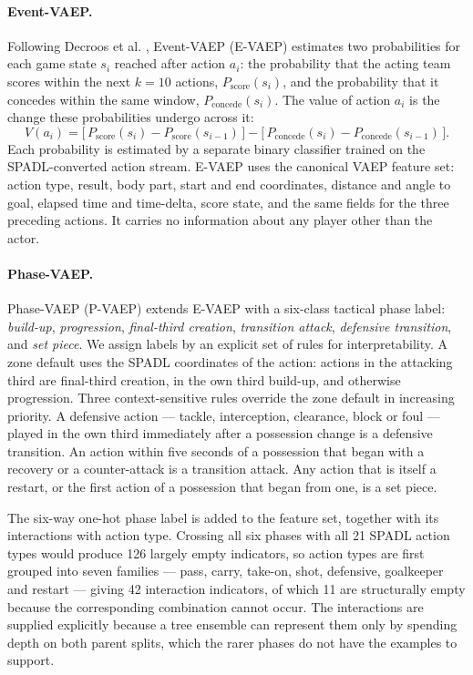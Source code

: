 \documentclass[runningheads]{llncs}
\begin{document}
\paragraph{\textbf{Event-VAEP.}}
Following Decroos et al. \cite{decroos2019actions}, Event-VAEP (E-VAEP) estimates two probabilities for each game state $s_i$ reached after action $a_i$: the probability that the acting team scores within the next $k = 10$ actions, $P_{\text{score}}(s_i)$, and the probability that it concedes within the same window, $P_{\text{concede}}(s_i)$. The value of action $a_i$ is the change these probabilities undergo across it:
\[
V(a_i) = \big[\, P_{\text{score}}(s_i) - P_{\text{score}}(s_{i-1}) \,\big] - \big[\, P_{\text{concede}}(s_i) - P_{\text{concede}}(s_{i-1}) \,\big].
\]
Each probability is estimated by a separate binary classifier trained on the SPADL-converted action stream. E-VAEP uses the canonical VAEP feature set: action type, result, body part, start and end coordinates, distance and angle to goal, elapsed time and time-delta, score state, and the same fields for the three preceding actions. It carries no information about any player other than the actor.
\paragraph{\textbf{Phase-VAEP.}}
Phase-VAEP (P-VAEP) extends E-VAEP with a six-class tactical phase label: \emph{build-up}, \emph{progression}, \emph{final-third creation}, \emph{transition attack}, \emph{defensive transition}, and \emph{set piece}. We assign labels by an explicit set of rules for interpretability. A zone default uses the SPADL coordinates of the action: actions in the attacking third are final-third creation, in the own third build-up, and otherwise progression. Three context-sensitive rules override the zone default in increasing priority. A defensive action --- tackle, interception, clearance, block or foul --- played in the own third immediately after a possession change is a defensive transition. An action within five seconds of a possession that began with a recovery or a counter-attack is a transition attack. Any action that is itself a restart, or the first action of a possession that began from one, is a set piece.

The six-way one-hot phase label is added to the feature set, together with its interactions with action type. Crossing all six phases with all 21 SPADL action types would produce 126 largely empty indicators, so action types are first grouped into seven families --- pass, carry, take-on, shot, defensive, goalkeeper and restart --- giving 42 interaction indicators, of which 11 are structurally empty because the corresponding combination cannot occur. The interactions are supplied explicitly because a tree ensemble can represent them only by spending depth on both parent splits, which the rarer phases do not have the examples to support.
\end{document}
